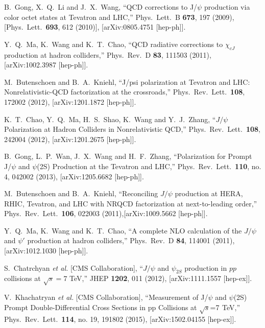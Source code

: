 \documentclass[aps,prc,preprint,superscriptaddress,showpacs,showkeys,amsmath]{revtex4-1}
\begin{document}
\begin{thebibliography}{100}
  B.~Gong, X.~Q.~Li and J.~X.~Wang,
  ``QCD corrections to J/$\psi$ production via color octet states at Tevatron and LHC,''
  Phys.\ Lett.\ B {\bf 673}, 197 (2009),
  [Phys.\ Lett.\  {\bf 693}, 612 (2010)],
  [arXiv:0805.4751 [hep-ph]].
  
  Y.~Q.~Ma, K.~Wang and K.~T.~Chao,
  ``QCD radiative corrections to $\chi_{cJ}$ production at hadron colliders,''
  Phys.\ Rev.\ D {\bf 83}, 111503 (2011),
  [arXiv:1002.3987 [hep-ph]].




  M.~Butenschoen and B.~A.~Kniehl,
  ``J/psi polarization at Tevatron and LHC: Nonrelativistic-QCD factorization at the crossroads,''
  Phys.\ Rev.\ Lett.\  {\bf 108}, 172002 (2012),
  [arXiv:1201.1872 [hep-ph]].
  
  K.~T.~Chao, Y.~Q.~Ma, H.~S.~Shao, K.~Wang and Y.~J.~Zhang,
  ``$J/\psi$ Polarization at Hadron Colliders in Nonrelativistic QCD,''
  Phys.\ Rev.\ Lett.\  {\bf 108}, 242004 (2012),
  [arXiv:1201.2675 [hep-ph]].
  
  B.~Gong, L.~P.~Wan, J.~X.~Wang and H.~F.~Zhang,
  ``Polarization for Prompt J/$\psi$ and $\psi$(2S) Production at the Tevatron and LHC,''
  Phys.\ Rev.\ Lett.\  {\bf 110}, no. 4, 042002 (2013),
  [arXiv:1205.6682 [hep-ph]].
 
  M.~Butenschoen and B.~A.~Kniehl,
  ``Reconciling $J/\psi$ production at HERA, RHIC, Tevatron, and LHC with NRQCD factorization at next-to-leading order,''
  Phys.\ Rev.\ Lett.\  {\bf 106}, 022003 (2011),[arXiv:1009.5662 [hep-ph]].
 

  Y.~Q.~Ma, K.~Wang and K.~T.~Chao,
  ``A complete NLO calculation of the $J/\psi$ and $\psi'$ production at hadron colliders,''
  Phys.\ Rev.\ D {\bf 84}, 114001 (2011),
  [arXiv:1012.1030 [hep-ph]].

  S.~Chatrchyan {\it et al.} [CMS Collaboration],
  ``$J/\psi$ and $\psi_{2S}$ production in $pp$ collisions at $\sqrt{s}=7$ TeV,''
  JHEP {\bf 1202}, 011 (2012),
  [arXiv:1111.1557 [hep-ex]].
  

  V.~Khachatryan {\it et al.} [CMS Collaboration],
  ``Measurement of J/$\psi$ and $\psi$(2S) Prompt Double-Differential Cross Sections in pp Collisions at $\sqrt{s}$=7  TeV,''
  Phys.\ Rev.\ Lett.\  {\bf 114}, no. 19, 191802 (2015),
  [arXiv:1502.04155 [hep-ex]].



\end{thebibliography}
\end{document}

